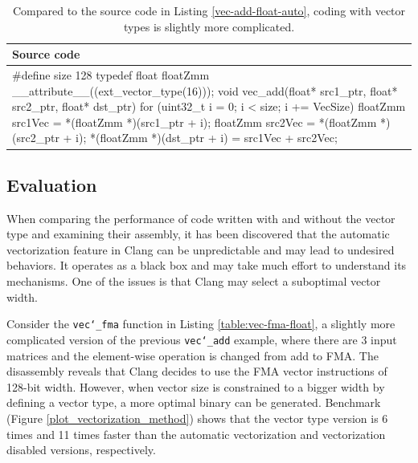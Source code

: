 \documentclass[logo,bsc,singlespacing,parskip]{infthesis}
\newenvironment{VerbatimCompact}
  {\vspace*{-2.5mm}\VerbatimEnvironment
   \par\Verbatim}
  {\endVerbatim\vspace*{-2.4mm}}
\begin{document}
\begin{table}[ht]\captionsetup{name=Listing}
\begin{tabular}{>{\raggedright\arraybackslash}p{13cm}}
    Source code\\
    \midrule
    \begin{VerbatimCompact}
#define size 128
typedef float floatZmm __attribute__((ext_vector_type(16)));
void vec_add(float* src1_ptr, float* src2_ptr, float* dst_ptr) {
    for (uint32_t i = 0; i < size; i += VecSize){
        floatZmm src1Vec = *(floatZmm *)(src1_ptr + i);
        floatZmm src2Vec = *(floatZmm *)(src2_ptr + i);
        *(floatZmm *)(dst_ptr + i) = src1Vec + src2Vec;
    }
}
\end{VerbatimCompact}
\end{tabular}
\caption{Compared to the source code in Listing \ref{vec-add-float-auto},
coding with vector types is slightly more complicated.}
\label{vec-add-float-vecty}
\end{table}
\subsection{Evaluation}

\label{sec:vectorization-method-eval}
When comparing the performance of code written with and without the vector type
and examining their assembly, it has been discovered that the automatic
vectorization feature in Clang can be unpredictable and may lead to undesired
behaviors. It operates as a black box and may take much effort to understand
its mechanisms. One of the issues is that Clang may select a suboptimal vector
width.

Consider the \texttt{vec\char`_fma} function in Listing \ref{table:vec-fma-float}, a
slightly more complicated version of the previous \texttt{vec\char`_add} example,
where there are 3 input matrices and the element-wise operation is changed from
add to FMA. The disassembly reveals that Clang decides to use the FMA vector
instructions of 128-bit width. However, when vector size is constrained to a bigger
width by defining a vector type, a more optimal binary can be generated. Benchmark
(Figure \ref{plot_vectorization_method}) shows that the vector type version is 6
times and 11 times faster than the automatic vectorization and vectorization
disabled versions, respectively.
\end{document}
